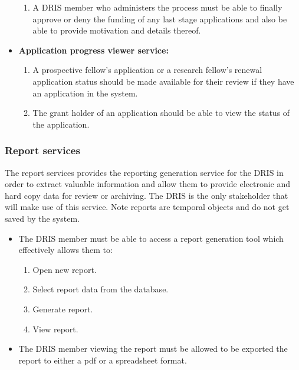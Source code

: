 \documentclass[12pt]{article}
\begin{document}
\begin{itemize}
\begin{enumerate}
			\item A DRIS member who administers the process must be able to finally approve or deny the funding of any last stage applications and also be able to provide motivation and details thereof.				 					
		\end{enumerate}
		\item\textbf{ Application progress viewer service:}
		\begin{enumerate}
			\item A prospective fellow's application or a research fellow's renewal application status should be made available for their review if they have an application in the system.
			\item The grant holder of an application should be able to view the status of the application.			
		\end{enumerate}
	\end{itemize}

\subsubsection{Report services}
	The report services provides the reporting generation service for the DRIS in order to extract valuable information and allow them to provide electronic and hard copy data for review or archiving. The DRIS is the only stakeholder that will make use of this service. Note reports are temporal objects and do not get saved by the system.
	\begin{itemize}
		\item The DRIS member must be able to access a report generation tool which effectively allows them to:
		\begin{enumerate}
			\item Open new report.
			\item Select report data from the database.
			\item Generate report.
			\item View report.
		\end{enumerate}
		\item The DRIS member viewing the report must be allowed to be exported the report to either a pdf or a spreadsheet format.	
	\end{itemize}
\end{document}
